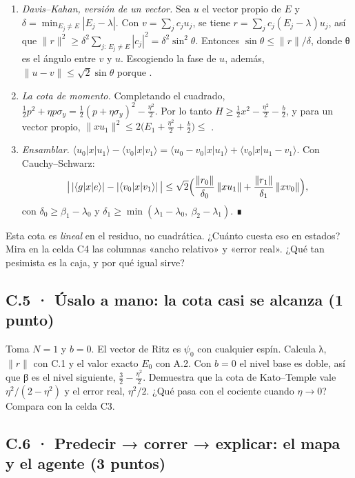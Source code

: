 \begin{enumerate}
\def\labelenumi{\arabic{enumi}.}
\item \emph{Davis--Kahan, versión de un vector.} Sea $u$ el vector propio de $E$ y $\delta = \min_{E_j\ne E}|E_j - \lambda|$. Con $v = \sum_j c_ju_j$, se tiene $r = \sum_j c_j(E_j - \lambda)u_j$, así que $\|r\|^2 \ge \delta^2 \sum_{j:\,E_j\ne E}|c_j|^2 = \delta^2\sin^2\theta$. Entonces $\sin\theta \le \|r\|/\delta$, donde θ es el ángulo entre $v$ y $u$. Escogiendo la fase de $u$, además, $\|u - v\| \le \sqrt2\sin\theta$ porque .
\item \emph{La cota de momento.} Completando el cuadrado, $\tfrac12 p^2 + \eta p\sigma_y = \tfrac12(p + \eta\sigma_y)^2 - \tfrac{\eta^2}{2}$. Por lo tanto $H \ge \tfrac12x^2 - \tfrac{\eta^2}{2} - \tfrac b2$, y para un vector propio, $\|x u_1\|^2 \le 2\bigl(E_1 + \tfrac{\eta^2}{2} + \tfrac b2\bigr) \le$ .
\item \emph{Ensamblar.} $\langle u_0|x|u_1\rangle - \langle v_0|x|v_1\rangle = \langle u_0 - v_0|x|u_1\rangle + \langle v_0|x|u_1 - v_1\rangle$. Con Cauchy--Schwarz:
\[ \bigl|\,|\langle g|x|e\rangle| - |\langle v_0|x|v_1\rangle|\,\bigr| \le \sqrt2\Bigl(\frac{\|r_0\|}{\delta_0}\,\|xu_1\| + \frac{\|r_1\|}{\delta_1}\,\|xv_0\|\Bigr), \]
con $\delta_0 \ge \beta_1 - \lambda_0$ y $\delta_1 \ge \min(\lambda_1 - \lambda_0,\ \beta_2 - \lambda_1)$. ∎
\end{enumerate}
Esta cota es \emph{lineal} en el residuo, no cuadrática. ¿Cuánto cuesta eso en estados? Mira en la celda C4 las columnas «ancho relativo» y «error real». ¿Qué tan pesimista es la caja, y por qué igual sirve?


\subsection{C.5 · Úsalo a mano: la cota casi se alcanza (1 punto)}

Toma $N = 1$ y $b = 0$. El vector de Ritz es $\psi_0$ con cualquier espín. Calcula λ, $\|r\|$ con C.1 y el valor exacto $E_0$ con A.2. Con $b = 0$ el nivel base es doble, así que β es el nivel siguiente, $\tfrac32 - \tfrac{\eta^2}{2}$. Demuestra que la cota de Kato--Temple vale $\eta^2/(2-\eta^2)$ y el error real, $\eta^2/2$. ¿Qué pasa con el cociente cuando $\eta \to 0$? Compara con la celda C3.


\subsection{C.6 · Predecir → correr → explicar: el mapa y el agente (3 puntos)}

